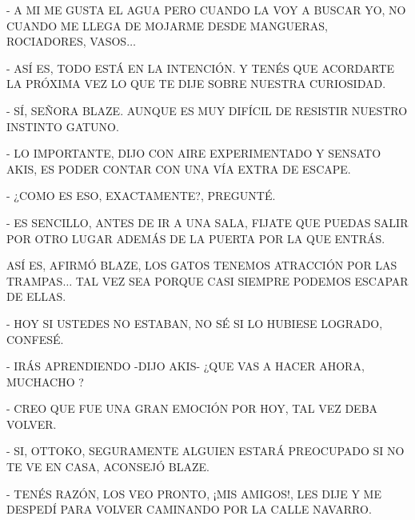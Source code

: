 - A MI ME GUSTA EL AGUA PERO CUANDO LA VOY A BUSCAR YO, NO CUANDO ME LLEGA   DE MOJARME DESDE MANGUERAS, ROCIADORES, VASOS$\ldots$

- ASÍ ES, TODO ESTÁ EN LA INTENCIÓN. Y TENÉS QUE ACORDARTE LA PRÓXIMA  VEZ LO QUE TE DIJE SOBRE NUESTRA CURIOSIDAD.

- SÍ, SEÑORA BLAZE. AUNQUE ES MUY DIFÍCIL DE RESISTIR NUESTRO INSTINTO GATUNO.

- LO IMPORTANTE, DIJO CON AIRE EXPERIMENTADO Y SENSATO AKIS, ES PODER CONTAR CON UNA VÍA EXTRA DE ESCAPE.

- ¿COMO ES ESO, EXACTAMENTE?, PREGUNTÉ.

- ES SENCILLO, ANTES DE IR A UNA SALA, FIJATE QUE PUEDAS SALIR POR OTRO LUGAR ADEMÁS DE LA PUERTA POR LA QUE ENTRÁS.


\newpage
{}
\newpage
{}
ASÍ ES, AFIRMÓ BLAZE, LOS GATOS TENEMOS ATRACCIÓN POR LAS TRAMPAS$\ldots$ TAL VEZ SEA PORQUE CASI SIEMPRE PODEMOS ESCAPAR DE ELLAS.

- HOY SI USTEDES NO ESTABAN, NO SÉ SI LO HUBIESE LOGRADO, CONFESÉ.

- IRÁS APRENDIENDO -DIJO AKIS- ¿QUE VAS A HACER AHORA, MUCHACHO ?

- CREO QUE FUE UNA GRAN EMOCIÓN POR HOY, TAL VEZ DEBA VOLVER.

- SI,  OTTOKO, SEGURAMENTE ALGUIEN ESTARÁ PREOCUPADO SI NO TE VE EN CASA, ACONSEJÓ BLAZE.

- TENÉS RAZÓN, LOS VEO PRONTO, ¡MIS AMIGOS!, LES DIJE Y ME DESPEDÍ PARA VOLVER CAMINANDO POR LA CALLE NAVARRO.

